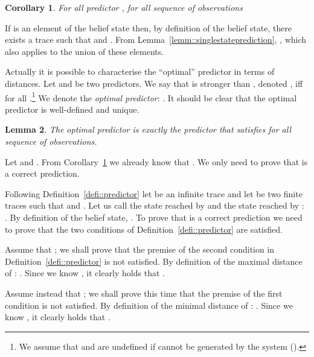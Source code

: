 \documentclass{article}
\newtheorem{lemm}{Lemma}
\newtheorem{coro}[lemm]{Corollary}
\newenvironment{proof}{\par\noindent{\bf Proof}}{\hspace{\stretch{1}}}
\begin{document}
\begin{coro}\label{coro::predictorsupset}
  For all predictor , 
  for all sequence  of observations 
  
\end{coro}

\begin{proof}
  If  is an element of the belief state 
  then, by definition of the belief state, 
  there exists a trace  such that  
  and .  
  From Lemma~\ref{lemm::singlestateprediction}, 
  , 
  which also applies to the union of these elements.  
\end{proof}

Actually it is possible to characterise 
the ``optimal'' predictor in terms of distances.  
Let  and  be two predictors.  
We say that  is stronger than , denoted , 
iff  for all .\footnote{We assume that  and  
are undefined if  cannot be generated by the system 
().}
We denote  the \emph{optimal predictor}: 
.  
It should be clear that the optimal predictor is well-defined and unique.  

\begin{lemm}\label{lemm::defopti}
  The optimal predictor  
  is exactly the predictor that satisfies  
  for all sequence  of observations.  
\end{lemm}

\begin{proof}
  Let  
  and .  
  From Corollary~\ref{coro::predictorsupset} 
  we already know that .  
  We only need to prove that  
  is a correct prediction.  

  Following Definition~\ref{defi::predictor} 
  let  be an infinite trace 
  and let  be two finite traces 
  such that  and .  
  Let us call  the state reached by  
  and  the state reached by : 
  .  
  By definition of the belief state, .  
  To prove that  is a correct prediction 
  we need to prove that the two conditions 
  of Definition~\ref{defi::predictor} are satisfied.  

  Assume that ; 
  we shall prove that the premise of the second condition 
  in Definition~\ref{defi::predictor} is not satisfied.  
  By definition of the maximal distance of : 
  .  
  Since we know , it clearly holds 
  that .  

  Assume instead that ; 
  we shall prove this time 
  that the premise of the first condition is not satisfied.  
  By definition of the minimal distance of : 
  .  
  Since we know , it clearly holds 
  that .  
\end{proof}
\end{document}
